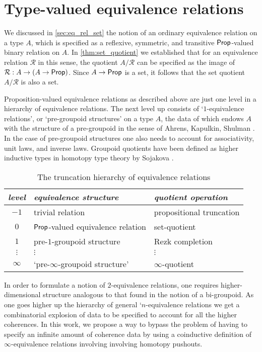 \chapter{Type-valued equivalence relations}

We discussed in \cref{sec:eq_rel_set} the notion of an ordinary equivalence relation on a type $A$, which is specified as a reflexive, symmetric, and transitive $\mathsf{Prop}$-valued binary relation on $A$. In \cref{thm:set_quotient} we established that for an equivalence relation $\mathcal{R}$ in this sense, the quotient $A/\mathcal{R}$ can be specified as the image of $\mathcal{R}:A\to (A\to \mathsf{Prop})$. Since $A\to \mathsf{Prop}$ is a set, it follows that the set quotient $A/\mathcal{R}$ is also a set. 

Proposition-valued equivalence relations as described above are just one level in a hierarchy of equivalence relations. The next level up consists of `$1$-equivalence relations', or `pre-groupoid structures' on a type $A$, the data of which endows $A$ with the structure of a pre-groupoid in the sense of Ahrens, Kapulkin, Shulman \cite{AKS}. In the case of pre-groupoid structures one also needs to account for associativity, unit laws, and inverse laws. Groupoid quotients have been defined as higher inductive types in homotopy type theory by Sojakova \cite{SojakovaPhD}.

\begin{table}\label{tab:hierarchy}
\caption{The truncation hierarchy of equivalence relations}
\begin{tabular}{cll}
\toprule
\emph{level} & \emph{equivalence structure} & \emph{quotient operation} \\
\midrule
$-1$ & trivial relation & propositional truncation \\
$0$ & $\mathsf{Prop}$-valued equivalence relation & set-quotient \\
$1$ & pre-$1$-groupoid structure & Rezk completion \\
$\vdots$ & \qquad$\vdots$ & \qquad$\vdots$ \\
$\infty$ & `pre-$\infty$-groupoid structure' & $\infty$-quotient \\
\bottomrule
\end{tabular}
\end{table}

In order to formulate a notion of $2$-equivalence relations, one requires higher-dimensional structure analogous to that found in the notion of a bi-groupoid. As one goes higher up the hierarchy of general `$n$-equivalence relations we get a combinatorial explosion of data to be specified to account for all the higher coherences. In this work, we propose a way to bypass the problem of having to specify an infinite amount of coherence data by using a coinductive definition of $\infty$-equivalence relations involving involving homotopy pushouts.


